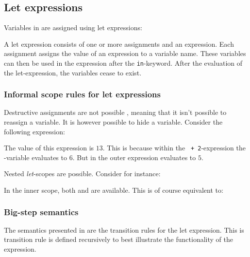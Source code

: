\subsection{Let expressions}
\label{sec:letexpressions}

Variables in \productname{} are assigned using let expressions:

\begin{ebnf}
\end{ebnf}

A let expression consists of one or more assignments and an expression. Each
assignment assigns the value of an expression to a variable name. These
variables can then be used in the expression after the \texttt{in}-keyword.
After the evaluation of the let-expression, the variables cease to exist.

\subsubsection{Informal scope rules for let expressions}

Destructive assignments are not possible \productname{}, meaning that it isn't
possible to reassign a variable. It is however possible to hide a variable.
Consider the following expression:


The value of this expression is $13$. This is because within the
\texttt{ + 2}-expression the -variable evaluates to $6$.
But in the outer expression  evaluates to $5$.

Nested \emph{let}-scopes are possible. Consider for instance:


In the inner scope, both  and  are available. This is of
course equivalent to:


\subsubsection{Big-step semantics}

The semantics presented in  are the transition rules for
the let expression.  This is transition rule is defined recursively to best
illustrate the functionality of the expression.


